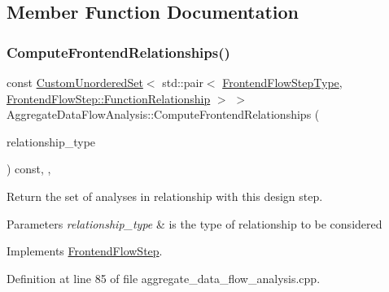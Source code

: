 \subsection{Member Function Documentation}
\mbox{\label{classAggregateDataFlowAnalysis_a7d4599f7adabe9d4af16055fc5ad1cdb}} 
\subsubsection{\texorpdfstring{Compute\+Frontend\+Relationships()}{ComputeFrontendRelationships()}}
{\footnotesize\ttfamily const \hyperlink{classCustomUnorderedSet}{Custom\+Unordered\+Set}$<$ std\+::pair$<$ \hyperlink{frontend__flow__step_8hpp_afeb3716c693d2b2e4ed3e6d04c3b63bb}{Frontend\+Flow\+Step\+Type}, \hyperlink{classFrontendFlowStep_af7cf30f2023e5b99e637dc2058289ab0}{Frontend\+Flow\+Step\+::\+Function\+Relationship} $>$ $>$ Aggregate\+Data\+Flow\+Analysis\+::\+Compute\+Frontend\+Relationships (\begin{DoxyParamCaption}\item[{const \hyperlink{classDesignFlowStep_a723a3baf19ff2ceb77bc13e099d0b1b7}{Design\+Flow\+Step\+::\+Relationship\+Type}}]{relationship\+\_\+type }\end{DoxyParamCaption}) const\hspace{0.3cm}{\ttfamily [override]}, {\ttfamily [private]}, {\ttfamily [virtual]}}



Return the set of analyses in relationship with this design step. 


\begin{DoxyParams}{Parameters}
{\em relationship\+\_\+type} & is the type of relationship to be considered \\
\hline
\end{DoxyParams}


Implements \hyperlink{classFrontendFlowStep_abeaff70b59734e462d347ed343dd700d}{Frontend\+Flow\+Step}.



Definition at line 85 of file aggregate\+\_\+data\+\_\+flow\+\_\+analysis.\+cpp.



